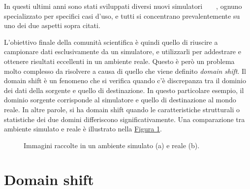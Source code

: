\documentclass[12pt]{report}
\begin{document}
In questi ultimi anni sono stati sviluppati diversi nuovi simulatori~\cite{kolve2022ai2thorinteractive3denvironment}~\cite{NEURIPS2021_021bbc7e}~\cite{urakami2022doorgymscalabledooropening}~\cite{1389727}, ognuno specializzato per specifici casi d'uso, e tutti si concentrano prevalentemente su uno dei due aspetti sopra citati.

L'obiettivo finale della comunità scientifica è quindi quello di riuscire a campionare dati esclusivamente da un simulatore, e utilizzarli per addestrare e ottenere risultati eccellenti in un ambiente reale. Questo è però un problema molto complesso da risolvere a causa di quello che viene definito \textit{domain shift}. Il domain shift è un fenomeno che si verifica quando c'è discrepanza tra il dominio dei dati della sorgente e quello di destinazione. In questo particolare esempio, il dominio sorgente corrisponde al simulatore e quello di destinazione al mondo reale. In altre parole, si ha domain shift quando le caratteristiche strutturali o statistiche dei due domini differiscono significativamente. Una comparazione tra ambiente simulato e reale è illustrato nella \hyperref[fig:immagine-simulata-reale]{Figura \ref{fig:immagine-simulata-reale}}.


\begin{figure}[t]
	\centering
	\hspace{0.01\textwidth}
	\caption{Immagini raccolte in un ambiente simulato (a) e reale (b).}
	\label{fig:immagine-simulata-reale}
\end{figure}

\section{Domain shift}
\label{sec:domain_shift}
\end{document}
